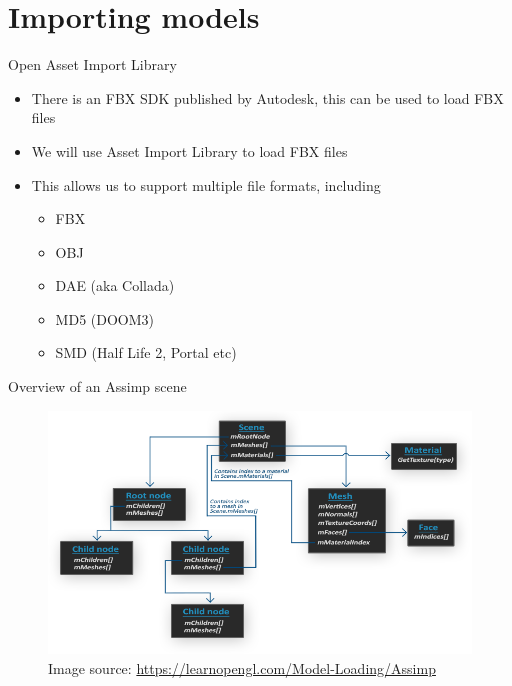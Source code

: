 \part{Importing models}
\frame{\partpage}

\begin{frame}{Open Asset Import Library}
	\begin{itemize}
		\item There is an FBX SDK published by Autodesk, this can be used to load FBX files
		\pause\item We will use Asset Import Library to load FBX files
		\pause\item This allows us to support multiple file formats, including
		\begin{itemize}
			\pause\item FBX
			\pause\item OBJ 
			\pause\item DAE (aka Collada)
			\pause\item MD5 (DOOM3)
			\pause\item SMD (Half Life 2, Portal etc)
		\end{itemize}
	\end{itemize}
\end{frame}

\begin{frame}{Overview of an Assimp scene}
	\begin{center}
		\begin{figure}[h!]
			\includegraphics[width=\textwidth]{assimp_structure}
			\caption*{Image source: \url{https://learnopengl.com/Model-Loading/Assimp}}
		\end{figure}
	\end{center}
\end{frame}

